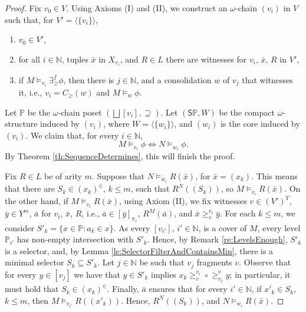 \documentclass[12pt]{amsart}
\theoremstyle{plain}
\newcommand \Sp{{\mathsf{S}}}
\newcommand \fr{\scriptscriptstyle{f}}
\newcommand \NN{\mathbb{N}}
\newcommand \PPb{\mathbb{P}}
\begin{document}
	\begin{proof}
		Fix $v_0 \in V$. Using Axioms (I) and (II), we construct an $\omega$-chain $(v_i)$ in $V$ such that, for  $V'=\langle \{v_i\} \rangle$,
		
		\begin{enumerate}
			\item $v_0 \in V'$,
			\item for all $i \in \NN$, tuples $\bar{x}$ in $X_{v_i}$, and $R \in L$ there are witnesses for $v_i$, $\bar{x}$, $R$ in $V'$,
			\item if $M \models_{v_i} \exists^{\fr}_{\geq} \phi$, then there is $j \in \NN$, and a consolidation $w$ of $v_j$ that witnesses it, i.e., $v_i=C_{ \geq} (w)$ and $M \models_{w} \phi$.
		\end{enumerate}
		 Let $\PPb$ be the $\omega$-chain poset $(\bigsqcup [v_i], \supseteq)$. Let $(\Sp \PPb,W)$ be the compact $\omega$-structure induced by $(v_i)$, where $W=\langle \{w_i\} \rangle$, and $(w_i)$ is the core induced by $(v_i)$.
		 We claim that, for every $i \in \NN$,
		\[ M \models_{v_i} \phi \iff N \models_{w_i} \phi. \]
		By Theorem \ref{th:SequenceDetermines}, this will finish the proof.
		
		Fix $R \in L$ be of arity $m$. Suppose that $N \models_{w_i} R(\bar{x})$, for $\bar{x}=(x_k)$. This means that there are $S_k \in (x_k)^\in$, $k \leq m$, such that $R^{N}((S_k))$, so $M \models_{v_i} R(\bar{x})$. On the other hand, if $M \models_{v_i} R(\bar{x})$, using Axiom (II), we fix witnesses $v \in (V')^Y$, $\bar{y} \in Y^m$, $\bar{a}$ for $v_i$, $\bar{x}$, $R$, i.e.,  $\bar{a} \in [\bar{y}]_{\pi_v}$, $R^M(\bar{a})$, and $\bar{x} \geq^{v_i}_v \bar{y}$.  %
		For each $k \leq m$, we consider $S'_k=\{x \in \PPb: a_k \in x\}$. As every $[v_{i'}]$, $i' \in \NN$, is a cover of $M$, every level $\PPb_{i'}$ has non-empty intersection with $S'_k$.  Hence, by Remark \ref{re:LevelsEnough}, $S'_k$ is a selector, and, by Lemma \ref{le:SelectorFilterAndContainsMin}, there is a minimal selector $S_k \subseteq S'_k$. Let $j \in \NN$ be such that $v_j$ fragments $v$. Observe that for every $y \in [v_j]$ we have that $y \in S'_k$ implies $x_k  \geq^{v_i}_v \circ \geq^{v}_{v_j} y$; in particular, it must hold that  $S_k \in (x_k)^\in$. Finally, $\bar{a}$ ensures that for every $i' \in \NN$, if $x'_k \in S_k$, $k \leq m$, then $M \models_{v_{i'}} R((x'_k))$. Hence,  $R^N((S_k))$, and $N \vDash_{w_i} R(\bar{x})$.
		

\end{proof}
\end{document}
